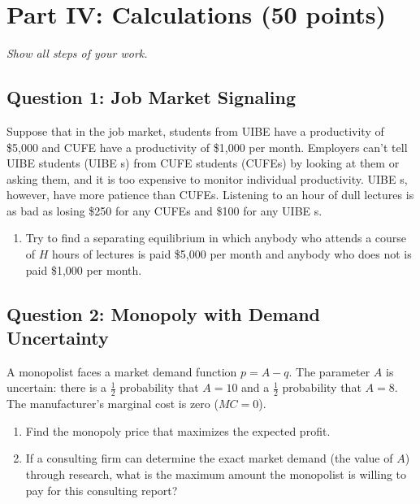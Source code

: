 \documentclass[12pt, a4paper]{article}
\begin{document}
\section*{Part IV: Calculations (50 points)}
\textit{Show all steps of your work.}

\subsection*{Question 1: Job Market Signaling}
Suppose that in the job market, students from UIBE  have a productivity of \$5,000 and CUFE have a productivity of \$1,000 per month. Employers can't tell UIBE  students (UIBE s) from CUFE students (CUFEs) by looking at them or asking them, and it is too expensive to monitor individual productivity. UIBE s, however, have more patience than CUFEs. Listening to an hour of dull lectures is as bad as losing \$250 for any CUFEs and \$100 for any UIBE s.
\begin{enumerate}
    \item[(a)] Try to find a separating equilibrium in which anybody who attends a course of $H$ hours of lectures is paid \$5,000 per month and anybody who does not is paid \$1,000 per month.
\end{enumerate}

\subsection*{Question 2: Monopoly with Demand Uncertainty}
A monopolist faces a market demand function $p = A - q$. The parameter $A$ is uncertain: there is a $\frac{1}{2}$ probability that $A=10$ and a $\frac{1}{2}$ probability that $A=8$. The manufacturer's marginal cost is zero ($MC=0$).
\begin{enumerate}
    \item[(a)] Find the monopoly price that maximizes the expected profit.
    \item[(b)] If a consulting firm can determine the exact market demand (the value of $A$) through research, what is the maximum amount the monopolist is willing to pay for this consulting report?
\end{enumerate}
\end{document}
